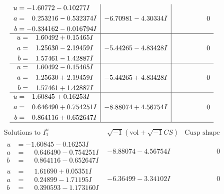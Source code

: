 \documentclass[1p]{elsarticle_modified}
\theoremstyle{definition}
\newcommand{\I}{\sqrt{-1}}
\begin{document}
$$\begin{array}{c|c|c}
\begin{aligned}
u &= -1.60772 - 0.10277 I \\
a &= \phantom{-}0.253216 - 0.532374 I \\
b &= -0.334162 - 0.016794 I\end{aligned}
 & -6.70981 - 4.30334 I & \phantom{-0.000000 } 0 \\ \hline\begin{aligned}
u &= \phantom{-}1.60492 + 0.15465 I \\
a &= \phantom{-}1.25630 - 2.19459 I \\
b &= \phantom{-}1.57461 - 1.42887 I\end{aligned}
 & -5.44265 - 4.83428 I & \phantom{-0.000000 } 0 \\ \hline\begin{aligned}
u &= \phantom{-}1.60492 - 0.15465 I \\
a &= \phantom{-}1.25630 + 2.19459 I \\
b &= \phantom{-}1.57461 + 1.42887 I\end{aligned}
 & -5.44265 + 4.83428 I & \phantom{-0.000000 } 0 \\ \hline\begin{aligned}
u &= -1.60845 + 0.16253 I \\
a &= \phantom{-}0.646490 + 0.754251 I \\
b &= \phantom{-}0.864116 + 0.652647 I\end{aligned}
 & -8.88074 + 4.56754 I & \phantom{-0.000000 } 0\\
 \hline 
 \end{array}$$\newpage$$\begin{array}{c|c|c}  
\text{Solutions to }I^u_{1}& \I (\text{vol} + \sqrt{-1}CS) & \text{Cusp shape}\\
 \hline 
\begin{aligned}
u &= -1.60845 - 0.16253 I \\
a &= \phantom{-}0.646490 - 0.754251 I \\
b &= \phantom{-}0.864116 - 0.652647 I\end{aligned}
 & -8.88074 - 4.56754 I & \phantom{-0.000000 } 0 \\ \hline\begin{aligned}
u &= \phantom{-}1.61690 + 0.05351 I \\
a &= \phantom{-}0.24899 - 1.71195 I \\
b &= \phantom{-}0.390593 - 1.173160 I\end{aligned}
 & -6.36499 - 3.34102 I & \phantom{-0.000000 } 0 \\ \hline\begin{aligned}

\end{aligned}
\end{array}$$
\end{document}
